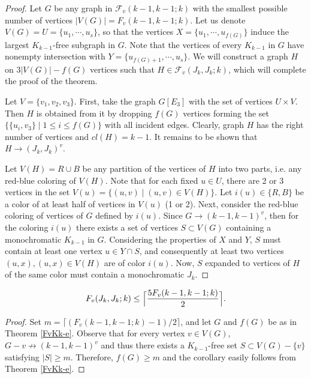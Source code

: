 \begin{proof}
Let $G$ be any graph in
$\mathcal{F}_v(k-1, k-1; k)$
with the smallest possible number of vertices
$|V(G)|=F_v(k-1, k-1; k)$. Let us denote
$V(G)=U=\{u_1,\cdots,u_s\}$, so that the vertices
$X=\{u_1,\cdots,u_{f(G)}\}$ induce the largest
$K_{k-1}$-free subgraph in $G$. Note that the
vertices of every $K_{k-1}$ in $G$ have
nonempty intersection with
$Y=\{u_{f(G)+1},\cdots,u_s\}$.
We will construct a graph $H$
on $3|V(G)|-f(G)$ vertices such that
$H \in \mathcal{F}_v(J_k,J_k;k)$, which will
complete the proof of the theorem.

Let $V=\{ v_1,v_2,v_3\}$.
First, take the graph $G[E_3]$ with the set
of vertices $U \times V$. Then $H$ is obtained
from it by dropping $f(G)$ vertices forming the set
$\{\{ u_i,v_3\}\;|\;1 \le i \le f(G)\}$ with
all incident edges. Clearly, graph $H$ has the right
number of vertices and $cl(H)=k-1$. It remains to
be shown that $H \rightarrow (J_k,J_k)^v$.

Let $V(H)=R \cup B$ be any partition
of the vertices of $H$ into two parts,
i.e. any red-blue coloring of $V(H)$.
Note that for each fixed
$u \in U$, there are 2 or 3 vertices in the set
$V(u)=\{(u,v)\;|\;(u,v) \in V(H)\}$.
Let $i(u) \in \{R,B\}$ be a color of at least
half of vertices in $V(u)$ (1 or 2).
Next, consider the red-blue coloring of vertices
of $G$ defined by $i(u)$.
Since $G \rightarrow (k-1,k-1)^v$, then
for the coloring $i(u)$
there exists a set of vertices $S \subset V(G)$
containing a monochromatic $K_{k-1}$ in $G$.
Considering the properties of $X$ and $Y$, $S$ must
contain at least one vertex $u \in Y \cap S$,
and consequently at least two vertices
$(u,x), (u,x) \in V(H)$ are of color $i(u)$.
Now, $S$ expanded to vertices of $H$ of
the same color must contain a monochromatic $J_k$.
\end{proof}

\medskip
\begin{cor}
$$F_v(J_k,J_k;k) \leq
\Bigl\lceil {{5 F_v(k-1, k-1; k)}\over 2}\Bigr\rceil.$$
\end{cor}

\medskip
\begin{proof}
Set $m=\lceil{(F_v(k-1, k-1; k)-1)/2}\rceil$, and let
$G$ and $f(G)$ be as in Theorem \ref{FvKk-e}.
Observe that for every vertex $v \in V(G)$,
$G-v \not\rightarrow (k-1,k-1)^v$ and thus there
exists a $K_ {k-1}$-free set $S \subset V(G) - \{v\}$
satisfying $|S| \ge m$.
Therefore, $f(G) \ge m$ and the corollary easily
follows from Theorem \ref{FvKk-e}.
\end{proof}

